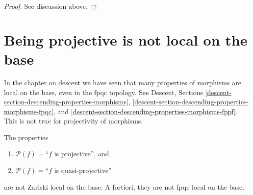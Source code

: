 \begin{proof}
See discussion above.
\end{proof}









\section{Being projective is not local on the base}
\label{section-non-descending-property-projective}

\noindent
In the chapter on descent we have seen that many properties of morphisms
are local on the base, even in the fpqc topology. See
Descent, Sections \ref{descent-section-descending-properties-morphisms},
\ref{descent-section-descending-properties-morphisms-fpqc}, and
\ref{descent-section-descending-properties-morphisms-fppf}.
This is not true for projectivity of morphisms.

\begin{lemma}
\label{lemma-non-descending-property-projective}
The properties
\begin{enumerate}
\item[] $\mathcal{P}(f) =$``$f$ is projective'', and
\item[] $\mathcal{P}(f) =$``$f$ is quasi-projective''
\end{enumerate}
are not Zariski local on the base. A fortiori, they are not fpqc local
on the base.
\end{lemma}

